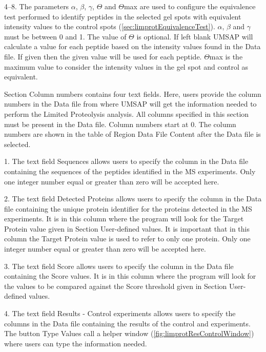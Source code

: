\numrange[range-phrase = --]{4}{8}. The parameters $\alpha$, $\beta$, $\gamma$,
$\Theta$ and $\Theta$max are used to configure the equivalence test\cite{Limentani2005a}
performed to identify peptides in the selected gel spots with equivalent intensity
values to the control spots (\autoref{sec:limprotEquivalenceTest}). $\alpha$, $\beta$ and 
$\gamma$ must be between \num{0} and \num{1}. The value of $\Theta$ is optional. If
left blank UMSAP will calculate a value for each peptide based on the intensity values
found in the Data file. If given then the given value will be used for each peptide.
$\Theta$max is the maximum value to consider the intensity values in the gel spot
and control as equivalent.

Section Column numbers contains four text fields. Here, users provide the column
numbers in the Data file from where UMSAP will get the information needed to perform
the Limited Proteolysis analysis. All columns specified in this section must be present
in the Data file. Column numbers start at \num{0}. The column numbers are shown in
the table of Region Data File Content after the Data file is selected.

\num{1}. The text field Sequences allows users to specify the column in the Data
file containing the sequences of the peptides identified in the MS experiments.
Only one integer number equal or greater than zero will be accepted here.

\num{2}. The text field Detected Proteins allows users to specify the column in
the Data file containing the unique protein identifier for the proteins detected
in the MS experiments. It is in this column where the program will look for the
Target Protein value given in Section User-defined values. It is important that
in this column the Target Protein value is used to refer to only one protein. Only
one integer number equal or greater than zero will be accepted here.

\num{3}. The text field Score allows users to specify the column in the Data file
containing the Score values. It is in this column where the program will look for
the values to be compared against the Score threshold given in Section User-defined
values.

\num{4}. \label{par:limprotResultControl}The text field Results - Control experiments
allows users to specify the columns in the Data file containing the results of the
control and experiments. The button Type Values call a helper window
(\autoref{fig:limprotResControlWindow}) where users can type the information needed. 

